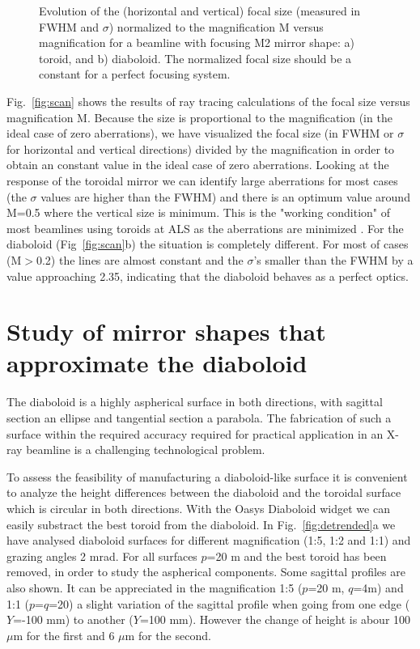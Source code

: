 \documentclass{iucr}              %
\begin{document}
\begin{figure}
\caption{
Evolution of the (horizontal and vertical) focal size (measured in FWHM and $\sigma$) normalized to the magnification M versus magnification for a beamline with focusing M2 mirror shape: a) toroid, and b) diaboloid. The normalized focal size should be a constant for a perfect focusing system.
}
\end{figure}


Fig.~\ref{fig:scan} shows the results of ray tracing calculations of the focal size versus magnification M. Because the size is proportional to the magnification (in the ideal case of zero aberrations), we have visualized the focal size (in FWHM or $\sigma$ for horizontal and vertical directions) divided by the magnification in order to obtain an constant value in the ideal case of zero aberrations. Looking at the response of the toroidal mirror we can identify large aberrations for most cases (the $\sigma$ values are higher than the FWHM) and there is an optimum value around M=0.5 where the vertical size is minimum. This is the "working condition" of most beamlines using toroids at ALS as the aberrations are minimized \cite{MacDowell2004}. For the diaboloid (Fig~\ref{fig:scan}b) the situation is completely different. For most of cases (M$>$0.2) the lines are almost constant and the $\sigma$'s smaller than the FWHM by a value approaching 2.35, indicating that the diaboloid behaves as a perfect optics. 


\section{Study of mirror shapes that approximate the diaboloid}
\label{sec:approximatedShapes}

The diaboloid is a highly aspherical surface in both directions, with sagittal section an ellipse and tangential section a parabola. The fabrication of such a surface within the required accuracy required for practical application in an X-ray beamline is a challenging technological problem. 


To assess the feasibility of manufacturing a diaboloid-like surface it is convenient to analyze the height differences between the diaboloid and the toroidal surface which is circular in both directions. With the Oasys Diaboloid widget we can easily substract the best toroid from the diaboloid. In Fig.~\ref{fig:detrended}a we have analysed diaboloid surfaces for different magnification (1:5, 1:2 and 1:1) and grazing angles 2 mrad. For all surfaces $p$=20 m and the best toroid has been removed, in order to study the aspherical components. Some sagittal profiles are also shown. It can be appreciated in the magnification 1:5 ($p$=20 m, $q$=4m) and 1:1 ($p$=$q$=20) a slight variation of the sagittal profile when going from one edge ($Y$=-100 mm) to another ($Y$=100 mm). However the change of height is abour 100 $\mu$m for the first and 6 $\mu$m for the second. 
\end{document}
